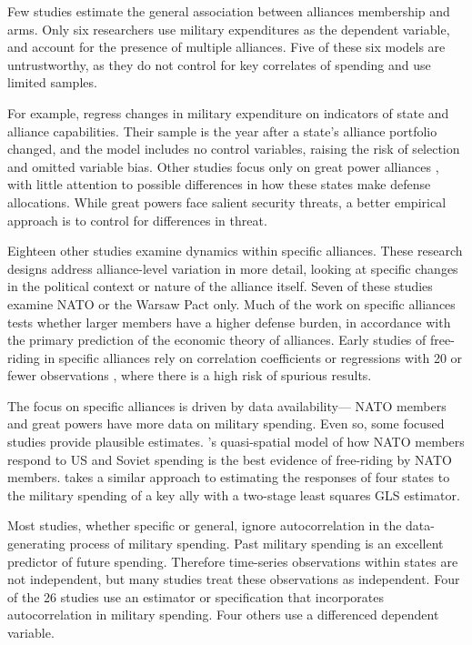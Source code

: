 \documentclass[12pt]{article}
\begin{document}
Few studies estimate the general association between alliances membership and arms. Only six researchers use military expenditures as the dependent variable, and account for the presence of multiple alliances. Five of these six models are untrustworthy, as they do not control for key correlates of spending and use limited samples. 

For example, \citet{MorganPalmer2003} regress changes in military expenditure on indicators of state and alliance capabilities. Their sample is the year after a state's alliance portfolio changed, and the model includes no control variables, raising the risk of selection and omitted variable bias. Other studies focus only on great power alliances \citep{ConybeareSandler1990, Conybeare1994, Diehl1994, MostSiverson1987}, with little attention to possible differences in how these states make defense allocations. While great powers face salient security threats, a better empirical approach is to control for differences in threat. 

Eighteen other studies examine dynamics within specific alliances. These research designs address alliance-level variation in more detail, looking at specific changes in the political context or nature of the alliance itself. Seven of these studies examine NATO or the Warsaw Pact only. Much of the work on specific alliances tests whether larger members have a higher defense burden, in accordance with the primary prediction of the economic theory of alliances. Early studies of free-riding in specific alliances rely on correlation coefficients or regressions with 20 or fewer observations \citep{OlsonZeckhauser1966, Starr1974, Reisinger1983, Siroky2012}, where there is a high risk of spurious results. 

The focus on specific alliances is driven by data availability--- NATO members and great powers have more data on military spending. Even so, some focused studies provide plausible estimates. \citet{PluemperNeumayer2015}'s quasi-spatial model of how NATO members respond to US and Soviet spending is the best evidence of free-riding by NATO members. \citet{Sorokin1994} takes a similar approach to estimating the responses of four states to the military spending of a key ally with a two-stage least squares GLS estimator.

Most studies, whether specific or general, ignore autocorrelation in the data-generating process of military spending. Past military spending is an excellent predictor of future spending. Therefore time-series observations within states are not independent, but many studies treat these observations as independent. Four of the 26 studies use an estimator or specification that incorporates autocorrelation in military spending. Four others use a differenced dependent variable. 
\end{document}
